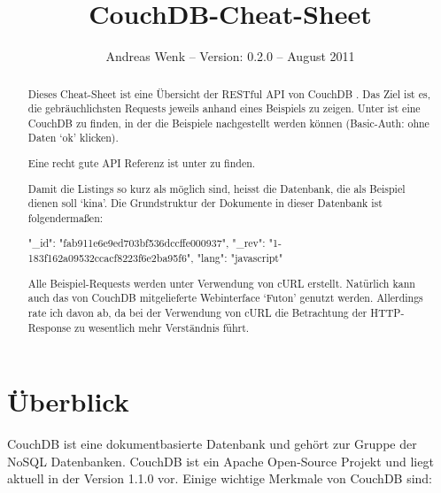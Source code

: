 \documentclass[19pt,landscape,twocolumn]{article}
\begin{document}
\fontsize{9}{10}\selectfont

\title{CouchDB-Cheat-Sheet}
\author{Andreas Wenk -- Version: 0.2.0 -- August 2011}
\date{}
\maketitle

\begin{abstract}
Dieses Cheat-Sheet ist eine Übersicht der RESTful API von CouchDB \cite{1}. Das Ziel ist es,
die gebräuchlichsten Requests jeweils anhand eines Beispiels zu zeigen. Unter \cite{2}
ist eine CouchDB zu finden, in der die Beispiele nachgestellt werden können (Basic-Auth: ohne 
Daten `ok' klicken). 

Eine recht gute API Referenz ist unter \cite{3} zu finden.

Damit die Listings so kurz als möglich sind, heisst die Datenbank, die als Beispiel dienen
soll `kina'. Die Grundstruktur der Dokumente in dieser Datenbank ist folgendermaßen:

\begin{code}
{
   "_id": "fab911e6e9ed703bf536dccffe000937",
   "_rev": "1-183f162a09532ccacf8223f6e2ba95f6",
   "lang": "javascript"
}
\end{code}

Alle Beispiel-Requests werden unter Verwendung von cURL \cite{10} erstellt. Natürlich kann auch das von 
CouchDB mitgelieferte Webinterface `Futon' genutzt werden. Allerdings rate ich davon ab, da 
bei der Verwendung von cURL die Betrachtung der HTTP-Response zu wesentlich mehr Verständnis führt.
\end{abstract}

\section{Überblick}

CouchDB ist eine dokumentbasierte Datenbank und gehört zur Gruppe der NoSQL Datenbanken. CouchDB
ist ein Apache Open-Source Projekt und liegt aktuell in der Version 1.1.0 vor. Einige wichtige 
Merkmale von CouchDB sind:
\end{document}
